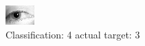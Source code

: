 \begin{figure}[h!]
\begin{center}
\includegraphics[width=0.60\columnwidth]{figures/ID1289_class_4_target_3.png}
\end{center}
\caption{ Classification: 4 actual target: 3}
\label{fig:ID1289_class_4_target_3}
\end{figure}
